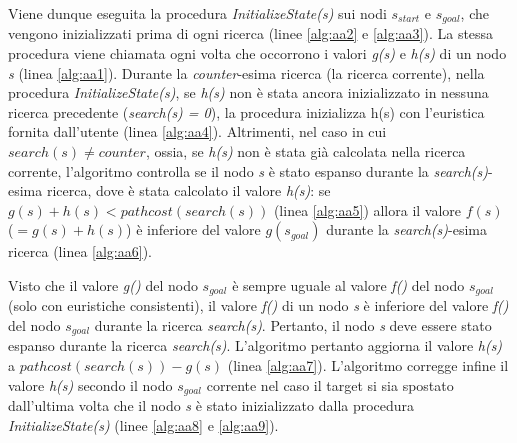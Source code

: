 \documentclass[12pt]{book}
\begin{document}
\par{Viene dunque eseguita la procedura \emph{InitializeState(s)} sui nodi $s_{start}$ e $s_{goal}$, che vengono inizializzati prima di ogni ricerca (linee \ref{alg:aa2} e \ref{alg:aa3}). La stessa procedura viene chiamata ogni volta che occorrono i valori \emph{g(s)} e \emph{h(s)} di un nodo \emph{s} (linea \ref{alg:aa1}). Durante la \emph{counter}-esima ricerca (la ricerca corrente), nella procedura \emph{InitializeState(s)}, se \emph{h(s)} non \`e stata ancora inizializzato in nessuna ricerca precedente (\emph{search(s) = 0}), la procedura inizializza h(s) con l'euristica fornita dall'utente (linea \ref{alg:aa4}). Altrimenti, nel caso in cui $search(s) \neq counter$, ossia, se \emph{h(s)} non \`e stata gi\`a calcolata nella ricerca corrente, l'algoritmo controlla se il nodo \emph{s} \`e stato espanso durante la \emph{search(s)}-esima ricerca, dove \`e stata calcolato il valore \emph{h(s)}: se $g(s) + h(s) < pathcost(search(s))$ (linea \ref{alg:aa5}) allora il valore $f(s)$ ($= g(s) + h(s)$) \`e inferiore del valore $g(s_{goal})$ durante la \emph{search(s)}-esima ricerca (linea \ref{alg:aa6}).}
\par{Visto che il valore \emph{g()} del nodo $s_{goal}$ \`e sempre uguale al valore \emph{f()} del nodo $s_{goal}$ (solo con euristiche consistenti), il valore \emph{f()} di un nodo \emph{s} \`e inferiore del valore \emph{f()} del nodo $s_{goal}$ durante la ricerca \emph{search(s)}. Pertanto, il nodo \emph{s} deve essere stato espanso durante la ricerca \emph{search(s)}. L'algoritmo pertanto aggiorna il valore \emph{h(s)} a $pathcost(search(s)) - g(s)$ (linea \ref{alg:aa7}). L'algoritmo corregge infine il valore \emph{h(s)} secondo il nodo $s_{goal}$ corrente nel caso il target si sia spostato dall'ultima volta che il nodo \emph{s} \`e stato inizializzato dalla procedura \emph{InitializeState(s)} (linee \ref{alg:aa8} e \ref{alg:aa9}).}
\end{document}
